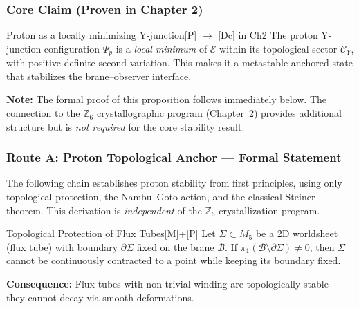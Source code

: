 \subsubsection{Core Claim (Proven in Chapter 2)}

\begin{edcPropositionBox}{Proton as a locally minimizing Y-junction}{[P] $\to$ [Dc] in Ch2}
The proton Y-junction configuration $\Psi_p$ is a \emph{local minimum} of $\mathcal{E}$
within its topological sector $\mathcal{C}_Y$, with positive-definite second variation.
This makes it a metastable anchored state that stabilizes the brane--observer interface.
\end{edcPropositionBox}

\noindent
\textbf{Note:} The formal proof of this proposition follows immediately below. The connection
to the $\mathbb{Z}_6$ crystallographic program (Chapter~2) provides additional structure but
is \emph{not required} for the core stability result.


\subsubsection{Route A: Proton Topological Anchor --- Formal Statement}
\label{sec:proton_anchor_formal}
\label{sec:proton_routeA_anchor}

The following chain establishes proton stability from first principles, using only
topological protection, the Nambu--Goto action, and the classical Steiner theorem.
This derivation is \emph{independent} of the $\mathbb{Z}_6$ crystallization program.

\begin{edcLemmaBox}{Topological Protection of Flux Tubes}{[M]+[P]}
\label{lem:topo_protection}
Let $\Sigma \subset M_5$ be a 2D worldsheet (flux tube) with boundary $\partial\Sigma$
fixed on the brane $\mathcal{B}$. If $\pi_1(\mathcal{B} \setminus \partial\Sigma) \neq 0$,
then $\Sigma$ cannot be continuously contracted to a point while keeping its boundary fixed.

\textbf{Consequence:} Flux tubes with non-trivial winding are topologically stable---they
cannot decay via smooth deformations.
\end{edcLemmaBox}


